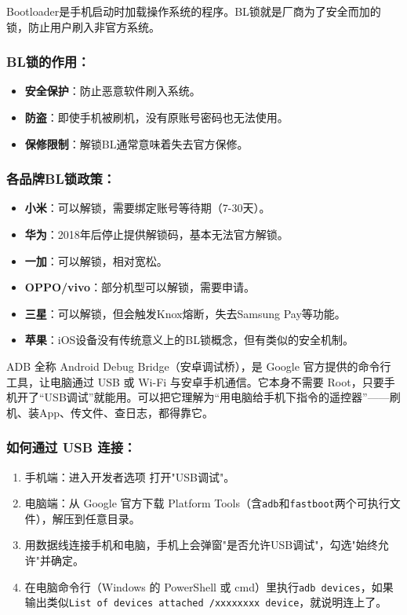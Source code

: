 
Bootloader是手机启动时加载操作系统的程序。BL锁就是厂商为了安全而加的锁，防止用户刷入非官方系统。

\subsubsection*{BL锁的作用：}

\begin{itemize}
  \item \textbf{安全保护}：防止恶意软件刷入系统。
  \item \textbf{防盗}：即使手机被刷机，没有原账号密码也无法使用。
  \item \textbf{保修限制}：解锁BL通常意味着失去官方保修。
\end{itemize}

\subsubsection*{各品牌BL锁政策：}

\begin{itemize}
  \item \textbf{小米}：可以解锁，需要绑定账号等待期（7-30天）。
  \item \textbf{华为}：2018年后停止提供解锁码，基本无法官方解锁。
  \item \textbf{一加}：可以解锁，相对宽松。
  \item \textbf{OPPO/vivo}：部分机型可以解锁，需要申请。
  \item \textbf{三星}：可以解锁，但会触发Knox熔断，失去Samsung Pay等功能。
  \item \textbf{苹果}：iOS设备没有传统意义上的BL锁概念，但有类似的安全机制。
\end{itemize}


ADB 全称 Android Debug Bridge（安卓调试桥），是 Google 官方提供的命令行工具，让电脑通过 USB 或 Wi-Fi 与安卓手机通信。它本身不需要 Root，只要手机开了“USB调试”就能用。可以把它理解为“用电脑给手机下指令的遥控器”——刷机、装App、传文件、查日志，都得靠它。

\subsubsection*{如何通过 USB 连接：}

\begin{enumerate}
  \item 手机端：进入开发者选项 打开"USB调试"。
  \item 电脑端：从 Google 官方下载 Platform Tools（含\texttt{adb}和\texttt{fastboot}两个可执行文件），解压到任意目录。
  \item 用数据线连接手机和电脑，手机上会弹窗"是否允许USB调试"，勾选"始终允许"并确定。
  \item 在电脑命令行（Windows 的 PowerShell 或 cmd）里执行\texttt{adb devices}，如果输出类似\texttt{List of devices attached /\allowbreak  xxxxxxxx device}，就说明连上了。
\end{enumerate}

